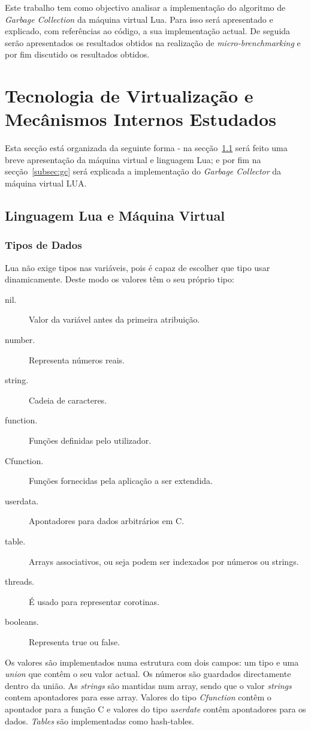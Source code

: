 \documentclass{article}
\begin{document}
Este trabalho tem como objectivo analisar a implementação do algoritmo de \emph{Garbage Collection} da máquina virtual Lua. Para isso será apresentado e explicado, com referências ao código, a sua implementação actual. De seguida serão apresentados os resultados obtidos na realização de \emph{micro-brenchmarking} e por fim discutido os resultados obtidos.

%
\section{Tecnologia de Virtualização e Mecânismos Internos Estudados}
\label{sec:estudo}
%
Esta secção está organizada da seguinte forma - na secção~\ref{subsec:basico} será feito uma breve apresentação da máquina virtual e linguagem Lua; e por fim na secção~\ref{subsec:gc} será explicada a implementação do \emph{Garbage Collector} da máquina virtual LUA. 

%
\subsection{Linguagem Lua e Máquina Virtual}
\label{subsec:basico}
%

\subsubsection{Tipos de Dados}
Lua não exige tipos nas variáveis, pois é capaz de escolher que tipo usar dinamicamente.
Deste modo os valores têm o seu próprio tipo:
\begin{description}
\item[nil.] Valor da variável antes da primeira atribuição.
\item[number.] Representa números reais.
\item[string.] Cadeia de caracteres.
\item[function.] Funções definidas pelo utilizador.
\item[Cfunction.] Funções fornecidas pela aplicação a ser extendida.
\item[userdata.] Apontadores para dados arbitrários em C.
\item[table.] Arrays associativos, ou seja podem ser indexados por números ou strings.
\item[threads.] É usado para representar corotinas.
\item[booleans.] Representa true ou false.
\end{description}

Os valores são implementados numa estrutura com dois campos: um tipo e uma \emph{union} que contêm o seu valor actual.
Os números são guardados directamente dentro da união. As \emph{strings} são mantidas num array, sendo que o valor \emph{strings} contem apontadores para esse array. Valores do tipo \emph{Cfunction} contêm o apontador para a função C e valores do tipo \emph{userdate} contêm apontadores para os dados. \emph{Tables} são implementadas como hash-tables.
\end{document}
